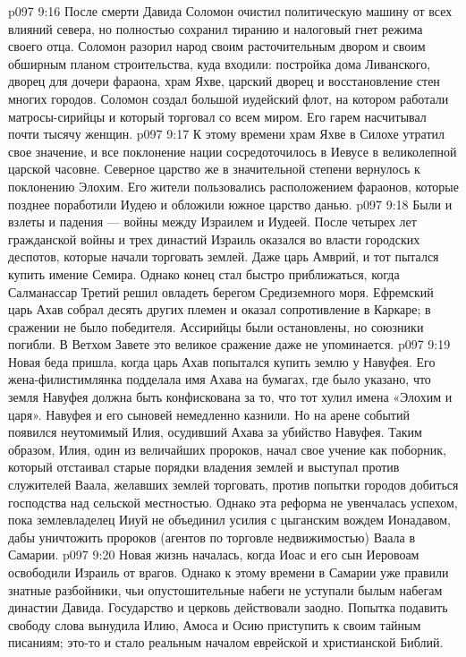 \vs p097 9:16 \pc После смерти Давида Соломон очистил политическую машину от всех влияний севера, но полностью сохранил тиранию и налоговый гнет режима своего отца. Соломон разорил народ своим расточительным двором и своим обширным планом строительства, куда входили: постройка дома Ливанского, дворец для дочери фараона, храм Яхве, царский дворец и восстановление стен многих городов. Соломон создал большой иудейский флот, на котором работали матросы\hyp{}сирийцы и который торговал со всем миром. Его гарем насчитывал почти тысячу женщин.
\vs p097 9:17 \pc К этому времени храм Яхве в Силохе утратил свое значение, и все поклонение нации сосредоточилось в Иевусе в великолепной царской часовне. Северное царство же в значительной степени вернулось к поклонению Элохим. Его жители пользовались расположением фараонов, которые позднее поработили Иудею и обложили южное царство данью.
\vs p097 9:18 Были и взлеты и падения --- войны между Израилем и Иудеей. После четырех лет гражданской войны и трех династий Израиль оказался во власти городских деспотов, которые начали торговать землей. Даже царь Амврий, и тот пытался купить имение Семира. Однако конец стал быстро приближаться, когда Салманассар Третий решил овладеть берегом Средиземного моря. Ефремский царь Ахав собрал десять других племен и оказал сопротивление в Каркаре; в сражении не было победителя. Ассирийцы были остановлены, но союзники погибли. В Ветхом Завете это великое сражение даже не упоминается.
\vs p097 9:19 Новая беда пришла, когда царь Ахав попытался купить землю у Навуфея. Его жена\hyp{}филистимлянка подделала имя Ахава на бумагах, где было указано, что земля Навуфея должна быть конфискована за то, что тот хулил имена «Элохим и царя». Навуфея и его сыновей немедленно казнили. Но на арене событий появился неутомимый Илия, осудивший Ахава за убийство Навуфея. Таким образом, Илия, один из величайших пророков, начал свое учение как поборник, который отстаивал старые порядки владения землей и выступал против служителей Ваала, желавших землей торговать, против попытки городов добиться господства над сельской местностью. Однако эта реформа не увенчалась успехом, пока землевладелец Ииуй не объединил усилия с цыганским вождем Ионадавом, дабы уничтожить пророков (агентов по торговле недвижимостью) Ваала в Самарии.
\vs p097 9:20 \pc Новая жизнь началась, когда Иоас и его сын Иеровоам освободили Израиль от врагов. Однако к этому времени в Самарии уже правили знатные разбойники, чьи опустошительные набеги не уступали былым набегам династии Давида. Государство и церковь действовали заодно. Попытка подавить свободу слова вынудила Илию, Амоса и Осию приступить к своим тайным писаниям; это\hyp{}то и стало реальным началом еврейской и христианской Библий.
